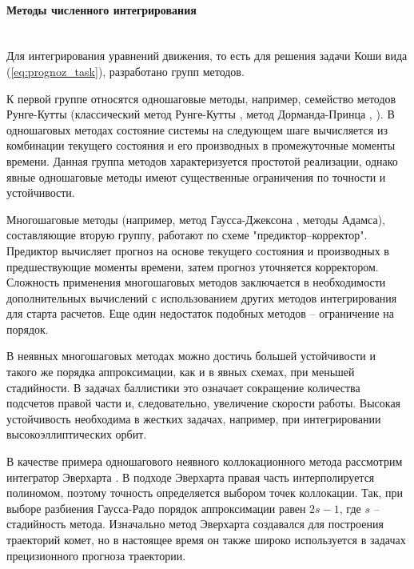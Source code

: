\paragraph{Методы численного интегрирования} \mbox{} \\

Для интегрирования уравнений движения, то есть для решения задачи Коши вида (\ref{eq:prognoz_task}),
разработано групп методов. 

К первой группе относятся одношаговые методы, например,
семейство методов Рунге-Кутты (классический метод Рунге-Кутты \cite{Kutta1901}, метод Дорманда-Принца \cite{Dormand1980}, \cite{Prince1981}).
В одношаговых методах состояние системы на следующем шаге вычисляется из комбинации
текущего состояния и его производных в промежуточные моменты времени. Данная группа
методов характеризуется простотой реализации,
однако явные одношаговые методы имеют существенные ограничения по точности и устойчивости.

Многошаговые методы (например, метод Гаусса-Джексона \cite{Berry2004}, методы Адамса), 
составляющие вторую группу, работают по схеме "предиктор--корректор".
Предиктор вычисляет прогноз на основе текущего состояния и производных в предшествующие
моменты времени, затем прогноз уточняется корректором. Сложность применения 
многошаговых методов заключается в необходимости дополнительных вычислений с использованием
других методов интегрирования для старта расчетов. Еще один недостаток подобных методов -- 
ограничение на порядок.

В неявных многошаговых методах можно достичь большей устойчивости и такого же порядка аппроксимации, 
как и в явных схемах, при меньшей стадийности. В задачах баллистики это означает сокращение количества 
подсчетов правой части и, следовательно, увеличение скорости работы. Высокая устойчивость
необходима в жестких задачах, например, при интегрировании высокоэллиптических орбит.

В качестве примера одношагового неявного коллокационного метода рассмотрим 
интегратор Эверхарта \cite{Everhart1985}. В подходе Эверхарта правая часть интерполируется полиномом,
поэтому точность определяется выбором точек коллокации. Так, при выборе разбиения
Гаусса-Радо порядок аппроксимации равен $2 s - 1$, где $s$ -- стадийность метода.
Изначально метод Эверхарта создавался для построения траекторий комет, 
но в настоящее время он также широко используется в задачах прецизионного прогноза траектории.